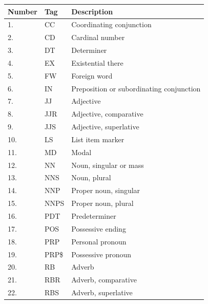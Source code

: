 \begin{table}[h!]
\centering
\begin{tabular}{|l|l|l|}
\hline
Number & Tag   & Description                              \\ \hline
1.     & CC    & Coordinating conjunction                 \\ \hline
2.     & CD    & Cardinal number                          \\ \hline
3.     & DT    & Determiner                               \\ \hline
4.     & EX    & Existential there                        \\ \hline
5.     & FW    & Foreign word                             \\ \hline
6.     & IN    & Preposition or subordinating conjunction \\ \hline
7.     & JJ    & Adjective                                \\ \hline
8.     & JJR   & Adjective, comparative                   \\ \hline
9.     & JJS   & Adjective, superlative                   \\ \hline
10.    & LS    & List item marker                         \\ \hline
11.    & MD    & Modal                                    \\ \hline
12.    & NN    & Noun, singular or mass                   \\ \hline
13.    & NNS   & Noun, plural                             \\ \hline
14.    & NNP   & Proper noun, singular                    \\ \hline
15.    & NNPS  & Proper noun, plural                      \\ \hline
16.    & PDT   & Predeterminer                            \\ \hline
17.    & POS   & Possessive ending                        \\ \hline
18.    & PRP   & Personal pronoun                         \\ \hline
19.    & PRP\$ & Possessive pronoun                       \\ \hline
20.    & RB    & Adverb                                   \\ \hline
21.    & RBR   & Adverb, comparative                      \\ \hline
22.    & RBS   & Adverb, superlative                      \\ \hline

\end{tabular}
\end{table}

